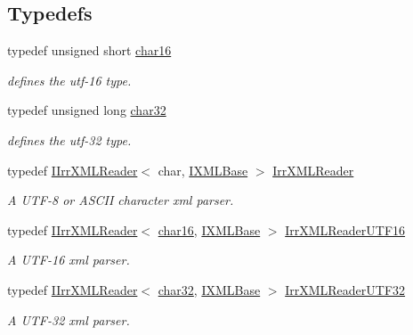 \subsection*{Typedefs}
\begin{CompactItemize}
\item 
typedef unsigned short \hyperlink{namespaceirr_1_1io_5e70682de915fd223e6aa77bb693fc74}{char16}
\begin{CompactList}\small\item\em defines the utf-16 type. \item\end{CompactList}\item 
typedef unsigned long \hyperlink{namespaceirr_1_1io_ab102cb4e8212cf98c1561064eb36e9e}{char32}
\begin{CompactList}\small\item\em defines the utf-32 type. \item\end{CompactList}\item 
typedef \hyperlink{classirr_1_1io_1_1_i_irr_x_m_l_reader}{IIrrXMLReader}$<$ char, \hyperlink{classirr_1_1io_1_1_i_x_m_l_base}{IXMLBase} $>$ \hyperlink{namespaceirr_1_1io_1628edbb9d5d53f18c82d2a92b0ad27e}{IrrXMLReader}
\begin{CompactList}\small\item\em A UTF-8 or ASCII character xml parser. \item\end{CompactList}\item 
typedef \hyperlink{classirr_1_1io_1_1_i_irr_x_m_l_reader}{IIrrXMLReader}$<$ \hyperlink{namespaceirr_1_1io_5e70682de915fd223e6aa77bb693fc74}{char16}, \hyperlink{classirr_1_1io_1_1_i_x_m_l_base}{IXMLBase} $>$ \hyperlink{namespaceirr_1_1io_5eb4094dfd0d509e0cd8a9d1dd30a5b9}{IrrXMLReaderUTF16}
\begin{CompactList}\small\item\em A UTF-16 xml parser. \item\end{CompactList}\item 
typedef \hyperlink{classirr_1_1io_1_1_i_irr_x_m_l_reader}{IIrrXMLReader}$<$ \hyperlink{namespaceirr_1_1io_ab102cb4e8212cf98c1561064eb36e9e}{char32}, \hyperlink{classirr_1_1io_1_1_i_x_m_l_base}{IXMLBase} $>$ \hyperlink{namespaceirr_1_1io_70f411ff403636fb5c4e9becb090d5ec}{IrrXMLReaderUTF32}
\begin{CompactList}\small\item\em A UTF-32 xml parser. \item\end{CompactList}\end{CompactItemize}
